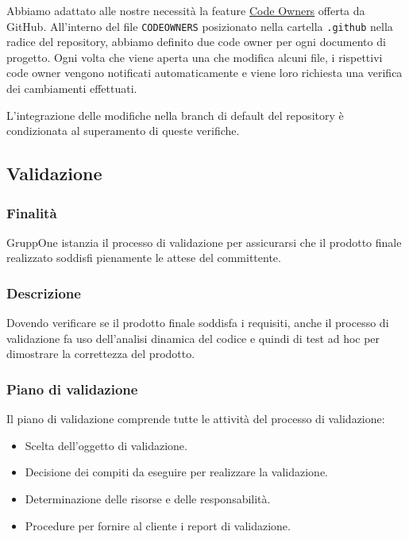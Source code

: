 \documentclass[../norme-di-progetto.tex]{subfiles}
\begin{document}
Abbiamo adattato alle nostre necessità la feature \href{https://help.github.com/en/github/creating-cloning-and-archiving-repositories/about-code-owners}{Code Owners} offerta da GitHub.
All'interno del file \verb|CODEOWNERS| posizionato nella cartella \verb|.github| nella radice del repository, abbiamo definito due code owner per ogni documento di progetto.
Ogni volta che viene aperta una  che modifica alcuni file, i rispettivi code owner vengono notificati automaticamente e viene loro richiesta una verifica dei cambiamenti effettuati.

L'integrazione delle modifiche nella branch di default del repository è condizionata al superamento di queste verifiche.

\subsection{Validazione}%
\label{sub:validazione}

\subsubsection{Finalità}%
\label{subs:validazione/finalita}

GruppOne istanzia il processo di validazione per assicurarsi che il prodotto finale realizzato soddisfi pienamente le attese del committente.

\subsubsection{Descrizione}%
\label{subs:validazione/descrizione}

Dovendo verificare se il prodotto finale soddisfa i requisiti, anche il processo di validazione fa uso dell'analisi dinamica del codice e quindi di test ad hoc per dimostrare la correttezza del prodotto.

\subsubsection{Piano di validazione}%
\label{subs:piano_di_validazione}

Il piano di validazione comprende tutte le attività del processo di validazione:

\begin{itemize}
  \item Scelta dell'oggetto di validazione.
  \item Decisione dei compiti da eseguire per realizzare la validazione.
  \item Determinazione delle risorse e delle responsabilità.
  \item Procedure per fornire al cliente i report di validazione.
\end{itemize}
\end{document}
